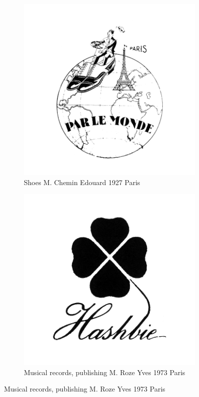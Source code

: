 \begin{figure}[h]
  \begin{subfigure}{.45\textwidth}
    \centering
    \includegraphics[width=.5\linewidth]{images/supplement/trademarks/french/8_34}
    \caption{Shoes M. Chemin Edouard 1927 Paris}
    \label{fig:trademarks:french:8.34}
  \end{subfigure}\hfill
  \begin{subfigure}{.45\textwidth}
    \centering
    \includegraphics[width=.5\linewidth]{images/supplement/trademarks/french/9_14}
    \caption{Musical records, publishing M. Roze Yves 1973 Paris}
    \label{fig:trademarks:french:9.14}
  \end{subfigure}


\end{figure}
